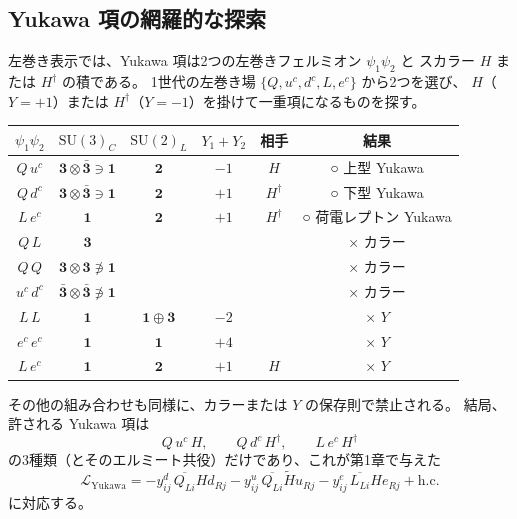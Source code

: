 \documentclass[uplatex,dvipdfmx,a4paper,11pt,openany]{jsbook}
\numberwithin{equation}{chapter}
\theoremstyle{definition}
\theoremstyle{plain}
\theoremstyle{remark}
\newcommand{\Lag}{\mathcal{L}}
\newcommand{\SU}{\mathrm{SU}}
\newcommand{\hc}{\mathrm{h.c.}}
\begin{document}
\subsection{Yukawa 項の網羅的な探索}
左巻き表示では、Yukawa 項は2つの左巻きフェルミオン $\psi_1\psi_2$ と
スカラー $H$ または $H^\dagger$ の積である。
1世代の左巻き場 $\{Q,u^c,d^c,L,e^c\}$ から2つを選び、
$H$（$Y=+1$）または $H^\dagger$（$Y=-1$）を掛けて一重項になるものを探す。
\begin{center}
\renewcommand{\arraystretch}{1.3}
\begin{tabular}{cccccc}
\toprule
$\psi_1\psi_2$ & $\SU(3)_C$ & $\SU(2)_L$ & $Y_1+Y_2$ & 相手 & 結果\\
\midrule
$Q\,u^c$ & $\mathbf3\otimes\bar{\mathbf3}\ni\mathbf1$ & $\mathbf2$ & $-1$ & $H$ & ○ 上型 Yukawa\\
$Q\,d^c$ & $\mathbf3\otimes\bar{\mathbf3}\ni\mathbf1$ & $\mathbf2$ & $+1$ & $H^\dagger$ & ○ 下型 Yukawa\\
$L\,e^c$ & $\mathbf1$ & $\mathbf2$ & $+1$ & $H^\dagger$ & ○ 荷電レプトン Yukawa\\
$Q\,L$ & $\mathbf3$ & & & & × カラー\\
$Q\,Q$ & $\mathbf3\otimes\mathbf3\not\ni\mathbf1$ & & & & × カラー\\
$u^c\,d^c$ & $\bar{\mathbf3}\otimes\bar{\mathbf3}\not\ni\mathbf1$ & & & & × カラー\\
$L\,L$ & $\mathbf1$ & $\mathbf1\oplus\mathbf3$ & $-2$ & & × $Y$\\
$e^c\,e^c$ & $\mathbf1$ & $\mathbf1$ & $+4$ & & × $Y$\\
$L\,e^c$ & $\mathbf1$ & $\mathbf2$ & $+1$ & $H$ & × $Y$\\
\bottomrule
\end{tabular}
\end{center}
その他の組み合わせも同様に、カラーまたは $Y$ の保存則で禁止される。
結局、許される Yukawa 項は
\begin{equation}
Q\,u^c\,H,\qquad Q\,d^c\,H^\dagger,\qquad L\,e^c\,H^\dagger
\end{equation}
の3種類（とそのエルミート共役）だけであり、これが第1章で与えた
\begin{equation}
\Lag_{\mathrm{Yukawa}}
=-y^d_{ij}\,\overline{Q_{Li}}Hd_{Rj}
-y^u_{ij}\,\overline{Q_{Li}}\tilde Hu_{Rj}
-y^e_{ij}\,\overline{L_{Li}}He_{Rj}+\hc
\label{eq:Yukawa-ch3}
\end{equation}
に対応する。
\end{document}

